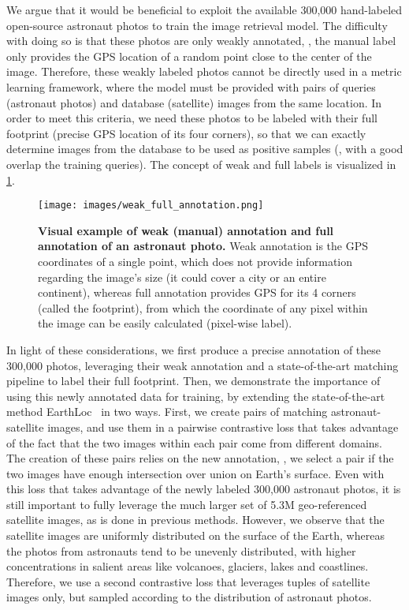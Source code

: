 We argue that it would be beneficial to exploit the available 300,000 hand-labeled open-source astronaut photos to train the image retrieval model. The difficulty with doing so is that these photos are only weakly annotated, \ie, the manual label only provides the GPS location of a random point close to the center of the image.
Therefore, these weakly labeled photos cannot be directly used in a metric learning framework, where the model must be provided with pairs of queries (astronaut photos) and database (satellite) images from the same location. In order to meet this criteria, we need these photos to be labeled with their full footprint (\ie precise GPS location of its four corners), so that we can exactly determine images from the database to be used as positive samples (\ie, with a good overlap \wrt the training queries). The concept of weak and full labels is visualized in \cref{fig:weak_full_annotation}.

\begin{figure}
    \begin{center}
    \texttt{[image: images/weak\_full\_annotation.png]}
    \end{center}
    \vspace{-5mm}
    \caption{\textbf{Visual example of weak (manual) annotation and full annotation of an astronaut photo.} Weak annotation is the GPS coordinates of a single point, which does not provide information regarding the image's size (\ie it could cover a city or an entire continent), whereas full annotation provides GPS for its 4 corners (called the footprint), from which the coordinate of any pixel within the image can be easily calculated (pixel-wise label).
    }
    \vspace{-5mm}
    \label{fig:weak_full_annotation}
\end{figure}


In light of these considerations, we first produce a precise annotation of these 300,000 photos, leveraging their weak annotation and a state-of-the-art matching pipeline to label their full footprint. 
Then, we demonstrate the importance of using this newly annotated data for training, by extending the state-of-the-art method EarthLoc~\cite{Berton_2024_EarthLoc} in two ways.
First, we create pairs of matching astronaut-satellite images, and use them in a pairwise contrastive loss that takes advantage of the fact that the two images within each pair come from different domains. The creation of these pairs relies on the new annotation, \ie, we select a pair if the two images have enough intersection over union on Earth's surface.
Even with this loss that takes advantage of the newly labeled 300,000 astronaut photos, it is still important to fully leverage the much larger set of 5.3M geo-referenced satellite images, as is done in previous methods. However, we observe that the satellite images are uniformly distributed on the surface of the Earth, whereas the photos from astronauts tend to be unevenly distributed, with higher concentrations in salient areas like volcanoes, glaciers, lakes and coastlines.
Therefore, we use a second contrastive loss that leverages tuples of satellite images only, but sampled according to the distribution of astronaut photos.

